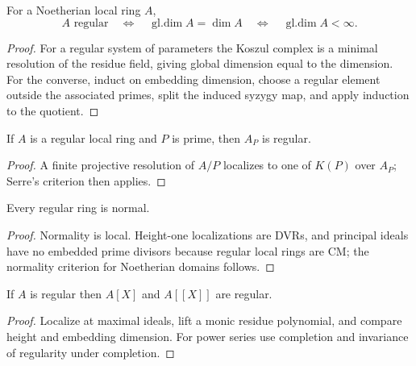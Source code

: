 \begin{theorem}\label{mcrt-thm-19-2}
For a Noetherian local ring $A$,
\[
A\text{ regular}\quad\Longleftrightarrow\quad
\operatorname{gl.dim}A=\dim A\quad\Longleftrightarrow\quad
\operatorname{gl.dim}A<\infty.
\]
\end{theorem}
\begin{proof}
For a regular system of parameters the Koszul complex is a minimal resolution
of the residue field, giving global dimension equal to the dimension.  For the
converse, induct on embedding dimension, choose a regular element outside the
associated primes, split the induced syzygy map, and apply induction to the
quotient.
\end{proof}

\begin{theorem}\label{mcrt-thm-19-3}
If $A$ is a regular local ring and $P$ is prime, then $A_P$ is regular.
\end{theorem}
\begin{proof}
A finite projective resolution of $A/P$ localizes to one of $K(P)$ over $A_P$;
Serre's criterion then applies.
\end{proof}

\begin{theorem}\label{mcrt-thm-19-4}
Every regular ring is normal.
\end{theorem}
\begin{proof}
Normality is local.  Height-one localizations are DVRs, and principal ideals
have no embedded prime divisors because regular local rings are CM; the normality
criterion for Noetherian domains follows.
\end{proof}

\begin{theorem}\label{mcrt-thm-19-5}
If $A$ is regular then $A[X]$ and $A[[X]]$ are regular.
\end{theorem}
\begin{proof}
Localize at maximal ideals, lift a monic residue polynomial, and compare height
and embedding dimension.  For power series use completion and invariance of
regularity under completion.
\end{proof}

